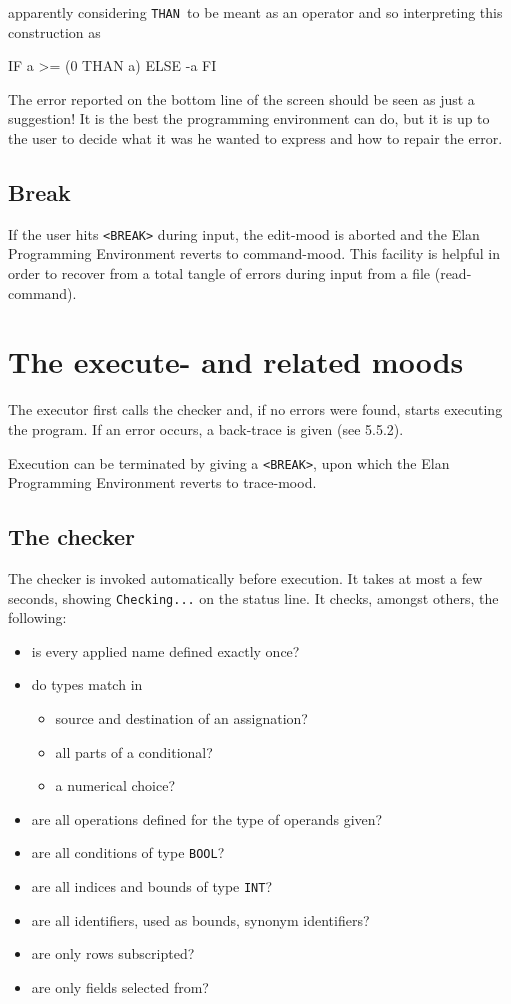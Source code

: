 \noindent
apparently considering {\tt THAN }to be meant as an operator
and so interpreting this construction as

\begin{elan}
        IF a >= (0 THAN a) ELSE -a FI
\end{elan}

The error reported on the bottom line of the screen should be
seen as just a suggestion! It is the best the programming environment
can do, but it is up to the user to decide what it was he wanted
to express and how to repair the error.

\subsection{Break}

If the user hits {\tt <BREAK>} during input, the edit-mood is aborted
and the Elan Programming Environment reverts to command-mood.
This facility is helpful in order to recover from a total tangle
of errors during input from a file (read-command).

\section{The execute- and related moods}
 
The executor first calls the checker and, if no errors were
found, starts executing the program. If an error occurs, a back-trace
is given (see 5.5.2).
 
Execution can be terminated by giving a {\tt <BREAK>}, upon which the
Elan Programming Environment reverts to trace-mood.

\subsection{The checker}

The checker is invoked automatically before execution. It takes
at most a few seconds, showing {\tt Checking...} on the status line.
It checks, amongst others, the following:

\begin{itemize}
\item	is every applied name defined exactly once?
\item 	do types match in
	\begin{itemize}
	\item	source and destination of an assignation?
	\item	all parts of a conditional?
	\item	a numerical choice?
	\end{itemize}
\item	are all operations defined for the type of operands given?
\item	are all conditions of type {\tt BOOL}?
\item	are all indices and bounds of type {\tt INT}?
\item	are all identifiers, used as bounds, synonym identifiers?
\item	are only rows subscripted?
\item	are only fields selected from?
\end{itemize}

